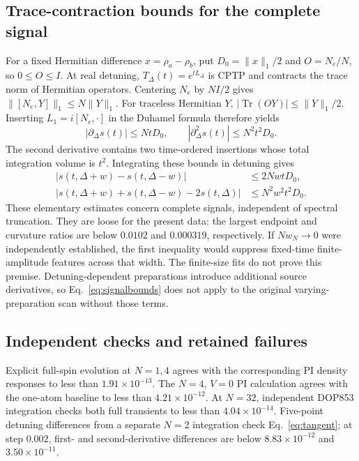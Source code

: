\documentclass[aps,pra,10pt,onecolumn,superscriptaddress,amsmath,amssymb]{revtex4-2}
\newcommand{\Tr}{\operatorname{Tr}}
\begin{document}
\subsection{Trace-contraction bounds for the complete signal}
For a fixed Hermitian difference $x=\rho_a-\rho_b$, put $D_0=\|x\|_1/2$ and $O=N_e/N$, so $0\le O\le I$. At real detuning, $T_\Delta(t)=e^{tL_\Delta}$ is CPTP and contracts the trace norm of Hermitian operators. Centering $N_e$ by $NI/2$ gives $\|[N_e,Y]\|_1\le N\|Y\|_1$. For traceless Hermitian $Y$, $|\Tr(OY)|\le\|Y\|_1/2$. Inserting $L_1=i[N_e,\cdot]$ in the Duhamel formula therefore yields
\begin{equation}
 |\partial_\Delta s(t)|\le NtD_0,\qquad
 |\partial_\Delta^2s(t)|\le N^2t^2D_0.
\end{equation}
The second derivative contains two time-ordered insertions whose total integration volume is $t^2$. Integrating these bounds in detuning gives
\begin{align}
 |s(t,\Delta+w)-s(t,\Delta-w)|&\le2NwtD_0,\\
 |s(t,\Delta+w)+s(t,\Delta-w)-2s(t,\Delta)|&\le N^2w^2t^2D_0.
 \label{eq:signalbounds}
\end{align}
These elementary estimates concern complete signals, independent of spectral truncation. They are loose for the present data: the largest endpoint and curvature ratios are below $0.0102$ and $0.000319$, respectively. If $Nw_N\to0$ were independently established, the first inequality would suppress fixed-time finite-amplitude features across that width. The finite-size fits do not prove this premise. Detuning-dependent preparations introduce additional source derivatives, so Eq.~\eqref{eq:signalbounds} does not apply to the original varying-preparation scan without those terms.

\subsection{Independent checks and retained failures}
Explicit full-spin evolution at $N=1,4$ agrees with the corresponding PI density responses to less than $1.91\times10^{-13}$. The $N=4$, $V=0$ PI calculation agrees with the one-atom baseline to less than $4.21\times10^{-12}$. At $N=32$, independent DOP853 integration checks both full transients to less than $4.04\times10^{-14}$. Five-point detuning differences from a separate $N=2$ integration check Eq.~\eqref{eq:tangent}; at step $0.002$, first- and second-derivative differences are below $8.83\times10^{-12}$ and $3.50\times10^{-11}$.
\end{document}
